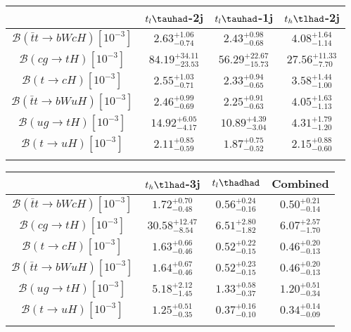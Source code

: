 \centering
\begin{tabular}{cccc} \toprule\toprule
& $t_l\tauhad$-2j & $t_l\tauhad$-1j & $t_h\tlhad$-2j\\\midrule
$\mathcal{B}(\bar{t}t\to bWcH)[10^{-3}]$                & $2.63^{+1.06}_{-0.74}$ & $2.43^{+0.98}_{-0.68}$ & $4.08^{+1.64}_{-1.14}$\\
$\mathcal{B}(cg\to tH)[10^{-3}]$                & $84.19^{+34.11}_{-23.53}$ & $56.29^{+22.67}_{-15.73}$ & $27.56^{+11.33}_{-7.70}$\\
$\mathcal{B}(t\to cH)[10^{-3}]$                & $2.55^{+1.03}_{-0.71}$ & $2.33^{+0.94}_{-0.65}$ & $3.58^{+1.44}_{-1.00}$\\
$\mathcal{B}(\bar{t}t\to bWuH)[10^{-3}]$                & $2.46^{+0.99}_{-0.69}$ & $2.25^{+0.91}_{-0.63}$ & $4.05^{+1.63}_{-1.13}$\\
$\mathcal{B}(ug\to tH)[10^{-3}]$                & $14.92^{+6.05}_{-4.17}$ & $10.89^{+4.39}_{-3.04}$ & $4.31^{+1.79}_{-1.20}$\\
$\mathcal{B}(t\to uH)[10^{-3}]$                & $2.11^{+0.85}_{-0.59}$ & $1.87^{+0.75}_{-0.52}$ & $2.15^{+0.88}_{-0.60}$\\
\bottomrule\bottomrule\\
\end{tabular}
\begin{tabular}{cccc} \toprule\toprule
 & $t_h\tlhad$-3j & $t_l\thadhad$ & Combined\\\midrule
$\mathcal{B}(\bar{t}t\to bWcH)[10^{-3}]$             & $1.72^{+0.70}_{-0.48}$ & $0.56^{+0.24}_{-0.16}$ & $0.50^{+0.21}_{-0.14}$\\
$\mathcal{B}(cg\to tH)[10^{-3}]$             & $30.58^{+12.47}_{-8.54}$ & $6.51^{+2.80}_{-1.82}$ & $6.07^{+2.57}_{-1.70}$\\
$\mathcal{B}(t\to cH)[10^{-3}]$             & $1.63^{+0.66}_{-0.46}$ & $0.52^{+0.22}_{-0.15}$ & $0.46^{+0.20}_{-0.13}$\\
$\mathcal{B}(\bar{t}t\to bWuH)[10^{-3}]$             & $1.64^{+0.67}_{-0.46}$ & $0.52^{+0.23}_{-0.15}$ & $0.46^{+0.20}_{-0.13}$\\
$\mathcal{B}(ug\to tH)[10^{-3}]$             & $5.18^{+2.12}_{-1.45}$ & $1.33^{+0.58}_{-0.37}$ & $1.20^{+0.51}_{-0.34}$\\
$\mathcal{B}(t\to uH)[10^{-3}]$             & $1.25^{+0.51}_{-0.35}$ & $0.37^{+0.16}_{-0.10}$ & $0.34^{+0.14}_{-0.09}$\\
\bottomrule\bottomrule\\
\end{tabular}




